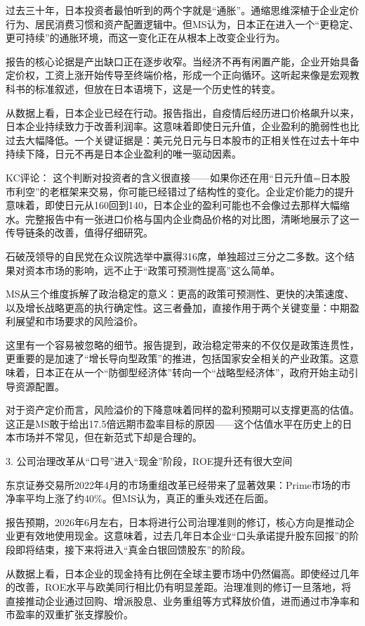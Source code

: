 \documentclass[11pt]{ctexart}
\begin{document}
过去三十年，日本投资者最怕听到的两个字就是“通胀”。通缩思维深植于企业定价行为、居民消费习惯和资产配置逻辑中。但MS认为，日本正在进入一个“更稳定、更可持续”的通胀环境，而这一变化正在从根本上改变企业行为。

报告的核心论据是产出缺口正在逐步收窄。当经济不再有闲置产能，企业开始具备定价权，工资上涨开始传导至终端价格，形成一个正向循环。这听起来像是宏观教科书的标准叙述，但放在日本语境下，这是一个历史性的转变。

从数据上看，日本企业已经在行动。报告指出，自疫情后经历进口价格飙升以来，日本企业持续致力于改善利润率。这意味着即使日元升值，企业盈利的脆弱性也比过去大幅降低。一个关键证据是：美元兑日元与日本股市的正相关性在过去十年中持续下降，日元不再是日本企业盈利的唯一驱动因素。

KC评论： 这个判断对投资者的含义很直接——如果你还在用“日元升值=日本股市利空”的老框架来交易，你可能已经错过了结构性的变化。企业定价能力的提升意味着，即使日元从160回到140，日本企业的盈利可能也不会像过去那样大幅缩水。完整报告中有一张进口价格与国内企业商品价格的对比图，清晰地展示了这一传导链条的改善，值得仔细研究。

石破茂领导的自民党在众议院选举中赢得316席，单独超过三分之二多数。这个结果对资本市场的影响，远不止于“政策可预测性提高”这么简单。

MS从三个维度拆解了政治稳定的意义：更高的政策可预测性、更快的决策速度、以及增长战略更高的执行确定性。这三者叠加，直接作用于两个关键变量：中期盈利展望和市场要求的风险溢价。

这里有一个容易被忽略的细节。报告提到，政治稳定带来的不仅仅是政策连贯性，更重要的是加速了“增长导向型政策”的推进，包括国家安全相关的产业政策。这意味着，日本正在从一个“防御型经济体”转向一个“战略型经济体”，政府开始主动引导资源配置。

对于资产定价而言，风险溢价的下降意味着同样的盈利预期可以支撑更高的估值。这正是MS敢于给出17.5倍远期市盈率目标的原因——这个估值水平在历史上的日本市场并不常见，但在新范式下却是合理的。

3. 公司治理改革从“口号”进入“现金”阶段，ROE提升还有很大空间

东京证券交易所2022年4月的市场重组改革已经带来了显著效果：Prime市场的市净率平均上涨了约40\%。但MS认为，真正的重头戏还在后面。

报告预期，2026年6月左右，日本将进行公司治理准则的修订，核心方向是推动企业更有效地使用现金。这意味着，过去几年日本企业“口头承诺提升股东回报”的阶段即将结束，接下来将进入“真金白银回馈股东”的阶段。

从数据上看，日本企业的现金持有比例在全球主要市场中仍然偏高。即使经过几年的改善，ROE水平与欧美同行相比仍有明显差距。治理准则的修订一旦落地，将直接推动企业通过回购、增派股息、业务重组等方式释放价值，进而通过市净率和市盈率的双重扩张支撑股价。
\end{document}
